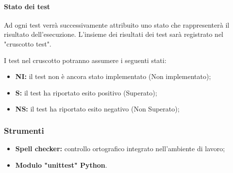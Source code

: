 \paragraph{Stato dei test}
Ad ogni test verrà successivamente attribuito uno stato che rappresenterà il risultato dell'esecuzione. L'insieme dei risultati dei test sarà registrato nel "cruscotto test".

I test nel cruscotto potranno assumere i seguenti stati:

\begin{itemize}
    \item \textbf{NI:} 
        il test non è ancora stato implementato (Non implementato);
    \item \textbf{S:} 
        il test ha riportato esito positivo (Superato);
    \item \textbf{NS:}
        il test ha riportato esito negativo (Non Superato);
\end{itemize}

\subsubsection{Strumenti}
\begin{itemize}
    \item \textbf{Spell checker:} 
        controllo ortografico integrato nell’ambiente di lavoro;
    \item \textbf{Modulo "unittest" Python}.
\end{itemize}